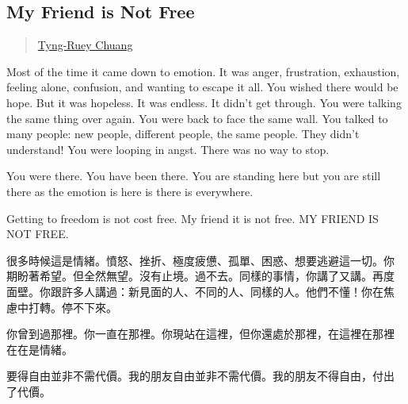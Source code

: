 \subsection{My Friend is Not Free}\label{my-friend-is-not-free}

\begin{quote}
\hyperlink{tyng-ruey-chuang}{Tyng-Ruey Chuang}
\end{quote}

Most of the time it came down to emotion. It was anger, frustration,
exhaustion, feeling alone, confusion, and wanting to escape it all. You
wished there would be hope. But it was hopeless. It was endless. It
didn't get through. You were talking the same thing over again. You were
back to face the same wall. You talked to many people: new people,
different people, the same people. They didn't understand! You were
looping in angst. There was no way to stop.

You were there. You have been there. You are standing here but you are
still there as the emotion is here is there is everywhere.

Getting to freedom is not cost free. My friend it is not free. MY FRIEND
IS NOT FREE.

很多時候這是情緒。憤怒、挫折、極度疲憊、孤單、困惑、想要逃避這一切。你
期盼著希望。但全然無望。沒有止境。過不去。同樣的事情，你講了又講。再度
面壁。你跟許多人講過：新見面的人、不同的人、同樣的人。他們不懂！你在焦
慮中打轉。停不下來。

你曾到過那裡。你一直在那裡。你現站在這裡，但你還處於那裡，在這裡在那裡
在在是情緒。

要得自由並非不需代價。我的朋友自由並非不需代價。我的朋友不得自由，付出
了代價。
